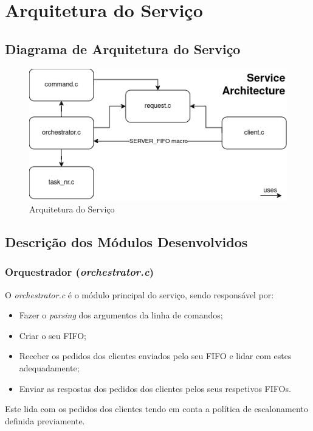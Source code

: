 \documentclass[a4paper,11pt]{scrreprt}
\begin{document}


\chapter{Arquitetura do Serviço}
    \section{Diagrama de Arquitetura do Serviço}
        \begin{figure}[!ht]
            \centering
            \includegraphics[scale=0.7]{diagrams/architecture.png}
            \caption{Arquitetura do Serviço}
            \label{fig:1.1}
        \end{figure}
    \section{Descrição dos Módulos Desenvolvidos}
        \subsection{Orquestrador (\textit{orchestrator.c})}
        O \textit{orchestrator.c} é o módulo principal do serviço, sendo responsável por:
        \begin{itemize}
            \item Fazer o \textit{parsing} dos argumentos da linha de comandos;
            \item Criar o seu FIFO;
            \item Receber os pedidos dos clientes enviados pelo seu FIFO e lidar com estes adequadamente;
            \item Enviar as respostas dos pedidos dos clientes pelos seus respetivos FIFOs.
        \end{itemize}
        Este lida com os pedidos dos clientes tendo em conta a política de escalonamento definida previamente.
\end{document}
